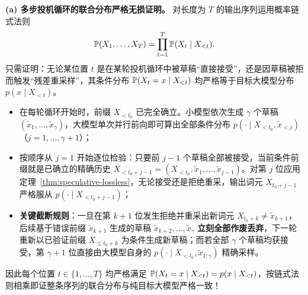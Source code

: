 
\textbf{(a) 多步投机循环的联合分布严格无损证明。} 对长度为 $T$ 的输出序列运用概率链式法则
\[
  \mathbb{P}(X_1, \dots, X_T) = \prod_{t=1}^T \mathbb{P}(X_t \mid X_{<t}).
\]
只需证明：无论某位置 $t$ 是在某轮投机循环中被草稿“直接接受”，还是因草稿被拒而触发“残差重采样”，其条件分布 $\mathbb{P}(X_t = x \mid X_{<t})$ 均严格等于目标大模型分布 $p(x \mid X_{<t})$。
\begin{itemize}
  \item 在每轮循环开始时，前缀 $X_{<t_0}$ 已完全确立。小模型依次生成 $\gamma$ 个草稿 $(\tilde{x}_1, \dots, \tilde{x}_\gamma)$，大模型单次并行前向即可算出全部条件分布 $p(\cdot \mid X_{<t_0}, \tilde{x}_{<j})$（$j = 1, \dots, \gamma + 1$）；
  \item 按顺序从 $j = 1$ 开始逐位检验：只要前 $j - 1$ 个草稿全部被接受，当前条件前缀就是已确立的精确历史 $X_{<t_0 + j - 1} = (X_{<t_0}, \tilde{x}_1, \dots, \tilde{x}_{j-1})$。对第 $j$ 位应用定理~\ref{thm:speculative-lossless}，无论接受还是拒绝重采，输出词元 $X_{t_0 + j - 1}$ 严格服从 $p(\cdot \mid X_{<t_0 + j - 1})$；
  \item \textbf{关键截断规则}：一旦在第 $k + 1$ 位发生拒绝并重采出新词元 $X_{t_0 + k} \neq \tilde{x}_{k+1}$，后续基于错误前缀 $\tilde{x}_{k+1}$ 生成的草稿 $\tilde{x}_{k+2}, \dots, \tilde{x}_\gamma$ \textbf{立刻全部作废丢弃}，下一轮重新以已验证前缀 $X_{\le t_0 + k}$ 为条件生成新草稿；而若全部 $\gamma$ 个草稿均获接受，第 $\gamma + 1$ 位直接由大模型自身的 $p(\cdot \mid X_{<t_0}, \tilde{x}_{1:\gamma})$ 精确采样。
\end{itemize}
因此每个位置 $t \in \{1, \dots, T\}$ 均严格满足 $\mathbb{P}(X_t = x \mid X_{<t}) = p(x \mid X_{<t})$，按链式法则相乘即证整条序列的联合分布与纯目标大模型严格一致！

